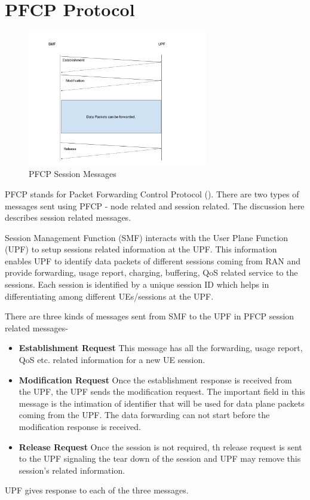        




\section {PFCP Protocol\label{sec:PFCP}}
 \begin{figure}[htbp]
    \centering
    \includegraphics[width=0.7\textwidth, keepaspectratio]{./fig/Introduction/PFCP.png}
    \caption{PFCP Session Messages}
    \label{fig:PFCP}
\end{figure}

PFCP stands for Packet Forwarding Control Protocol (\cite{5g29244}). 
 There are two types of messages sent using PFCP - node related and session related.
 The discussion here describes session related messages.

 Session Management Function (SMF) interacts with the User Plane Function (UPF) to setup sessions related 
 information at the UPF.
This  information enables UPF to identify data packets of different sessions coming from RAN 
and provide forwarding, usage report, charging, buffering, QoS related service to the sessions.
Each session is identified by a unique session ID which helps in differentiating 
among different UEs/sessions at the UPF. 

There are three kinds of messages sent from SMF to the UPF in PFCP session related messages-
\begin{itemize}
	\item \textbf{Establishment Request} This message has all the forwarding, usage report, QoS etc. related information for  a new UE session.  
	\item \textbf{Modification Request} Once the establishment response is
	received from the UPF, the UPF sends the modification request. The important field in this message is the intimation of identifier that will be used for data plane packets coming from the UPF. The data forwarding can not start before the modification response is received.
	\item \textbf{Release Request} Once the session is not required, th release 
	request is sent to the UPF signaling the tear down of the session and UPF
	 may remove this session's related information.
\end{itemize}
UPF gives response to each of the three messages. 
